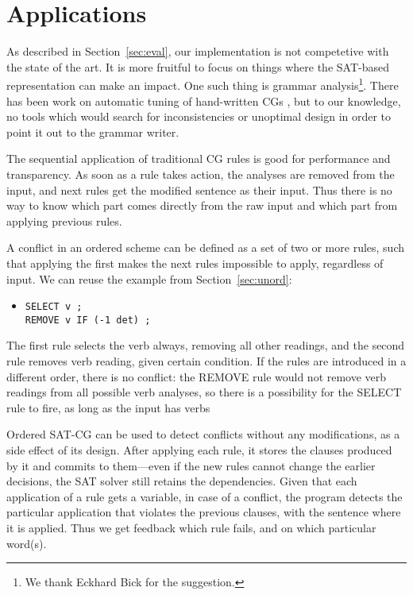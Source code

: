 \documentclass[11pt]{article}
\begin{document}
\section{Applications}
\label{sec:apps}
As described in Section~\ref{sec:eval}, our implementation is not
competetive with the state of the art. It is more fruitful to focus on
things where the SAT-based representation can make an impact.
One such thing is grammar analysis\footnote{We thank Eckhard Bick for
  the suggestion.}.
There has been work on automatic tuning of hand-written CGs
\cite{bick2013tuning}, but to our knowledge, no tools which would
search for inconsistencies or unoptimal design in order to point it out to the grammar writer.

The sequential application of traditional CG rules is good for
performance and transparency. As soon as a rule takes action, the analyses
are removed from the input, and next rules get the modified sentence
as their input. 
Thus there is no way to know which part comes directly from the
raw input and which part from applying previous rules.

A conflict in an ordered scheme can be defined as 
a set of two or more rules, such that applying the first makes the
next rules impossible to apply, regardless of input.
We can reuse the example from Section~\ref{sec:unord}:

\begin{itemize}
\item [] \texttt{SELECT v ;} \\
         \texttt{REMOVE v IF (-1 det) ;}
\end{itemize}

The first rule selects the verb always, removing all other readings,
and the second rule removes verb reading, given certain condition.
If the rules are introduced in a different order, there is no
conflict: the REMOVE rule would not remove verb readings from all
possible verb analyses, so there is a possibility for the SELECT rule
to fire, as long as the input has verbs

Ordered SAT-CG can be used to detect conflicts without any
modifications, as a side effect of its design. 
After applying each rule, it stores the clauses
produced by it and commits to them---even if the new rules cannot
change the earlier decisions, the SAT solver still retains the
dependencies.
Given that each application of a rule gets a variable,
in case of a conflict, the program detects the particular
application that violates the previous clauses, with the sentence
where it is applied. Thus we get feedback which rule fails, and on which
particular word(s).
\end{document}

